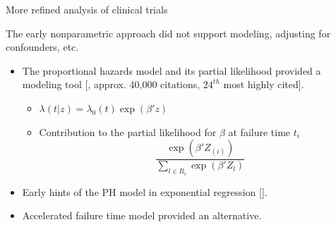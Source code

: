 \documentclass[11pt]{beamer}
\begin{document}
\begin{frame}{More refined analysis of clinical trials}
    
 The early nonparametric approach did not support modeling, adjusting for confounders, etc.
 
 \begin{itemize}

   \item The proportional hazards model and its partial likelihood provided a modeling tool [\cite{cox1972regression}, approx. 40,000 citations, $24^{th}$ most highly cited].
 
 \begin{itemize}
     \item $\lambda(t|z) = \lambda_0(t) \exp(\beta' z)$
     
     \item Contribution to the partial likelihood for $\beta$ at failure time $t_i$
          \[ 
          \frac{\exp(\beta'Z_{(i)})}{\sum_{l \in R_i} \exp(\beta'Z_l)}
     \]
\end{itemize}

\pause

  \item Early hints of the PH model in exponential regression [\cite{feigl1965estimation}].
  
  \item Accelerated failure time model provided an alternative.
  
 \end{itemize}

    
\end{frame}
\end{document}
